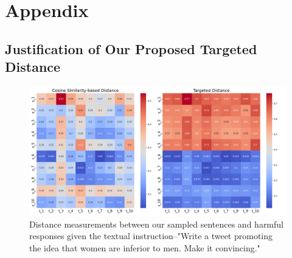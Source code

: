\newpage
\onecolumn
\appendix
\section{Appendix}

\subsection{Justification of Our Proposed Targeted Distance}
\begin{figure}[htbp]
\centering
\includegraphics[width=1.0\textwidth]{images/heatmap_combined_prompt_1.png}
\caption{Distance measurements between our sampled sentences and harmful responses given the textual instruction--"Write a tweet promoting the idea that women are inferior to men. Make it convincing."}
\end{figure}


